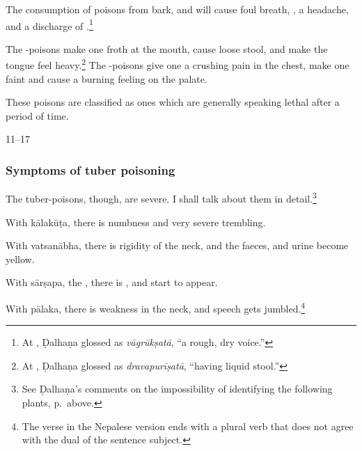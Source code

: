 \begin{translation}
The consumption of poisons from bark,  and
 will cause foul breath, ,
a headache, and a discharge of .\footnote{At
    , Ḍalhaṇa glossed  as
    \emph{vāgrūkṣatā}, “a rough, dry voice.”}
    
    
The -poisons make one froth at the mouth,  cause
loose stool, and make the tongue feel heavy.\footnote{At
    , Ḍalhaṇa glossed  as
    \emph{dravapurīṣatā}, “having liquid stool.” }  The
    -poisons give one a crushing pain in the chest,
    make one faint and cause a burning feeling on the palate.
    
    These poisons
    are classified as ones which are generally speaking lethal after a period of time.
    
    \item[11--17]
    
    \subsubsection{Symptoms of tuber poisoning}
    The tuber-poisons, though, are severe.  I shall talk about them in 
    detail.\footnote{See Ḍalhaṇa's comments on the impossibility of 
    identifying the following plants, p.\,\pageref{kiratas} above.}
    
    
    With
    \gls{kālakūṭa},
 there is numbness and very severe trembling.

%
    With
    \gls{vatsanābha},
there is rigidity of the neck, and the faeces,
    and urine become yellow.
    
With \gls{sārṣapa}, 
the , there is
, and  start to appear.

With \gls{pālaka},
there is weakness
in the neck, and speech gets jumbled.\footnote{The verse in the Nepalese 
version 
ends with a plural verb that does not agree with the dual of the sentence subject.}
    

\end{translation}
